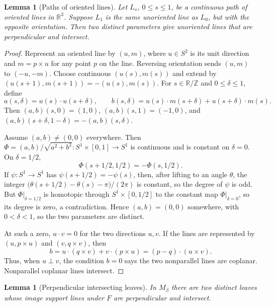 \documentclass[12pt]{article}
\newcommand{\R}{\mathbb R}
\newcommand{\Z}{\mathbb Z}
\theoremstyle{plain}
\newtheorem{lemma}[theorem]{Lemma}
\begin{document}
\begin{lemma}[Paths of oriented lines]\label{lem:lines}
Let \(L_s\), \(0\le s\le1\), be a continuous path of oriented lines in
\(\R^3\).  Suppose \(L_1\) is the same unoriented line as \(L_0\), but with the
opposite orientation.  Then two distinct parameters give unoriented lines that
are perpendicular and intersect.
\end{lemma}

\begin{proof}
Represent an oriented line by \((u,m)\), where \(u\in S^2\) is its unit
direction and \(m=p\times u\) for any point \(p\) on the line.  Reversing
orientation sends \((u,m)\) to \((-u,-m)\).  Choose continuous
\((u(s),m(s))\) and extend by \((u(s+1),m(s+1))=-(u(s),m(s))\).  For
\(s\in\R/\Z\) and \(0\le\delta\le1\), define
\[
a(s,\delta)=u(s)\cdot u(s+\delta),\qquad
b(s,\delta)=u(s)\cdot m(s+\delta)+u(s+\delta)\cdot m(s).
\]
Then \((a,b)(s,0)=(1,0)\), \((a,b)(s,1)=(-1,0)\), and
\((a,b)(s+\delta,1-\delta)=-(a,b)(s,\delta)\).

Assume \((a,b)\ne(0,0)\) everywhere.  Then
\(\Phi=(a,b)/\sqrt{a^2+b^2}:S^1\times[0,1]\to S^1\) is continuous and is
constant on \(\delta=0\).  On \(\delta=1/2\),
\[
\Phi(s+1/2,1/2)=-\Phi(s,1/2).
\]
If \(\psi:S^1\to S^1\) has \(\psi(s+1/2)=-\psi(s)\), then, after lifting to an
angle \(\theta\), the integer
\(\bigl(\theta(s+1/2)-\theta(s)-\pi\bigr)/(2\pi)\) is constant, so the degree
of \(\psi\) is odd.  But \(\Phi|_{\delta=1/2}\) is homotopic through
\(S^1\times[0,1/2]\) to the constant map \(\Phi|_{\delta=0}\), so its degree is
zero, a contradiction.  Hence \((a,b)=(0,0)\) somewhere, with
\(0<\delta<1\), so the two parameters are distinct.

At such a zero, \(u\cdot v=0\) for the two directions \(u,v\).  If the lines
are represented by \((u,p\times u)\) and \((v,q\times v)\), then
\[
b=u\cdot(q\times v)+v\cdot(p\times u)=(p-q)\cdot(u\times v).
\]
Thus, when \(u\perp v\), the condition \(b=0\) says the two nonparallel lines
are coplanar.  Nonparallel coplanar lines intersect.
\end{proof}

\begin{lemma}[Perpendicular intersecting leaves]\label{lem:perpleaves}
In \(M_\beta\) there are two distinct leaves whose image support lines under
\(F\) are perpendicular and intersect.
\end{lemma}
\end{document}
